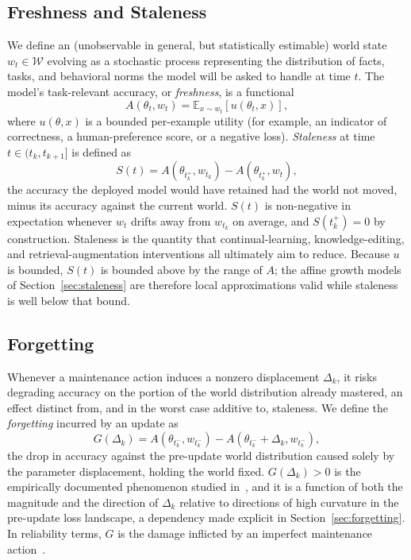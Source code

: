 \documentclass[electronics,article,submit,pdftex,moreauthors]{Definitions/mdpi}
\newcommand{\D}{\varDelta}                 %
\newcommand{\E}{\mathbb{E}}
\newcommand{\tkm}{t_k^{-}}
\newcommand{\tkp}{t_k^{+}}
\newcommand{\calW}{\mathcal{W}}
\begin{document}
\subsection{Freshness and Staleness}\label{sec:freshness}

We define an (unobservable in general, but statistically estimable) world state $w_t\in\calW$ evolving as a stochastic process representing the distribution of facts, tasks, and behavioral norms the model will be asked to handle at time $t$. The model's task-relevant accuracy, or \textit{freshness}, is a functional
\begin{equation}\label{eq:accuracy}
A(\theta_t,w_t)=\E_{x\sim w_t}\left[u(\theta_t,x)\right],
\end{equation}
where $u(\theta,x)$ is a bounded per-example utility (for example, an indicator of correctness, a human-preference score, or a negative loss). \textit{Staleness} at time $t\in(t_k,t_{k+1}]$ is defined as
\begin{equation}\label{eq:staleness}
S(t)=A\left(\theta_{\tkp},w_{t_k}\right)-A\left(\theta_{\tkp},w_t\right),
\end{equation}
the accuracy the deployed model would have retained had the world not moved, minus its accuracy against the current world. $S(t)$ is non-negative in expectation whenever $w_t$ drifts away from $w_{t_k}$ on average, and $S(\tkp)=0$ by construction. Staleness is the quantity that continual-learning, knowledge-editing, and retrieval-augmentation interventions all ultimately aim to reduce. Because $u$ is bounded, $S(t)$ is bounded above by the range of $A$; the affine growth models of Section~\ref{sec:staleness} are therefore local approximations valid while staleness is well below that bound.

\subsection{Forgetting}

Whenever a maintenance action induces a nonzero displacement $\D_k$, it risks degrading accuracy on the portion of the world distribution already mastered, an effect distinct from, and in the worst case additive to, staleness. We define the \textit{forgetting} incurred by an update as
\begin{equation}\label{eq:forgetting}
G(\D_k)=A\left(\theta_{\tkm},w_{\tkm}\right)-A\left(\theta_{\tkm}+\D_k,w_{\tkm}\right),
\end{equation}
the drop in accuracy against the pre-update world distribution caused solely by the parameter displacement, holding the world fixed. $G(\D_k)>0$ is the empirically documented phenomenon studied in~\cite{Kirkpatrick2017,Luo2023,Shi2024}, and it is a function of both the magnitude and the direction of $\D_k$ relative to directions of high curvature in the pre-update loss landscape, a dependency made explicit in Section~\ref{sec:forgetting}. In reliability terms, $G$ is the damage inflicted by an imperfect maintenance action~\cite{Pham1996}.
\end{document}
